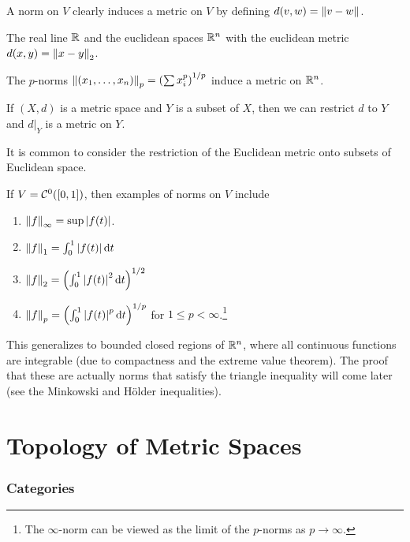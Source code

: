 A norm on $V$ clearly induces a metric on $V$ by defining $d(v, w) = \norm{v - w}$. 

\begin{example}
    The real line $\mathbb R$ and the euclidean spaces $\mathbb R^n$ with the euclidean metric $d(x, y) = \norm{x - y}_2$.
\end{example}

\begin{example}[$p$-norms]
    The $p$-norms $\norm{(x_1, \dots, x_n)}_p = \qty(\sum x_i^p)^{1/p}$ induce a metric on $\mathbb R^n$.
\end{example}

\begin{definition}
    If $(X, d)$ is a metric space and $Y$ is a subset of $X$, then we can restrict $d$ to $Y$ and $d\vert_Y$ is a metric on $Y$.
\end{definition}

It is common to consider the restriction of the Euclidean metric onto subsets of Euclidean space.

\begin{example}[$L^p$ norms]
    If $V = \mathcal C^0([0, 1])$, then examples of norms on $V$ include 
    \begin{enumerate}
        \item $\norm{f}_\infty = \sup{\abs{f(t)}}$.
        \item $\norm{f}_1 = \int_0^1 \abs{f(t)} \dd{t}$
        \item $\norm{f}_2 = \qty(\int_0^1 \abs{f(t)}^2 \dd{t})^{1/2}$
        \item $\norm{f}_p = \qty(\int_0^1 \abs{f(t)}^p \dd{t})^{1/p}$ for $1 \le p < \infty$.\footnote{The $\infty$-norm can be viewed as the limit of the $p$-norms as $p \to \infty$.}
    \end{enumerate}
\end{example}

This generalizes to bounded closed regions of $\mathbb R^n$, where all continuous functions are integrable (due to compactness and the extreme value theorem). The proof that these are actually norms that satisfy the triangle inequality will come later (see the Minkowski and H\"older inequalities).

\section{Topology of Metric Spaces}

\subsubsection*{Categories}

